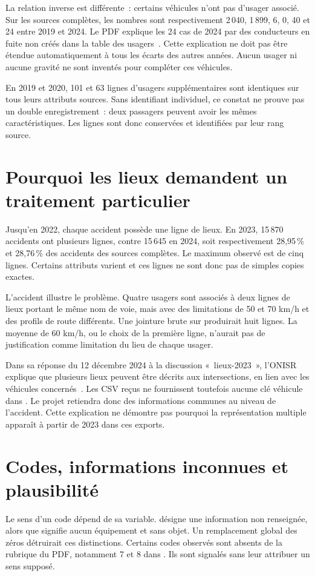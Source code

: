 La relation inverse est différente~: certains véhicules n'ont pas d'usager associé.
Sur les sources complètes, les nombres sont respectivement 2\,040, 1\,899, 6, 0, 40 et
24 entre 2019 et 2024. Le PDF explique les 24 cas de 2024 par des conducteurs en fuite
non créés dans la table des usagers~\cite{doc-onisr}. Cette explication ne doit pas être
étendue automatiquement à tous les écarts des autres années. Aucun usager ni aucune
gravité ne sont inventés pour compléter ces véhicules.

En 2019 et 2020, 101 et 63 lignes d'usagers supplémentaires sont identiques sur tous
leurs attributs sources. Sans identifiant individuel, ce constat ne prouve pas un
double enregistrement~: deux passagers peuvent avoir les mêmes caractéristiques.
Les lignes sont donc conservées et identifiées par leur rang source.

\section{Pourquoi les lieux demandent un traitement particulier}
Jusqu'en 2022, chaque accident possède une ligne de lieux. En 2023, 15\,870 accidents
ont plusieurs lignes, contre 15\,645 en 2024, soit respectivement 28,95\,\% et 28,76\,\%
des accidents des sources complètes. Le maximum observé est de cinq lignes. Certains
attributs varient et ces lignes ne sont donc pas de simples copies exactes.

L'accident  illustre le problème. Quatre usagers sont associés à
deux lignes de lieux portant le même nom de voie, mais avec des limitations de 50 et
70 km/h et des profils de route différents. Une jointure brute sur 
produirait huit lignes. La moyenne de 60 km/h, ou le choix de la première ligne,
n'aurait pas de justification comme limitation du lieu de chaque usager.

Dans sa réponse du 12 décembre 2024 à la discussion «~lieux-2023~», l'ONISR explique
que plusieurs lieux peuvent être décrits aux intersections, en lien avec les véhicules
concernés~\cite{discussion-lieux}. Les CSV reçus ne fournissent toutefois aucune clé
véhicule dans . Le projet retiendra donc des informations communes au
niveau de l'accident. Cette explication ne démontre pas pourquoi la représentation
multiple apparaît à partir de 2023 dans ces exports.

\section{Codes, informations inconnues et plausibilité}
Le sens d'un code dépend de sa variable.  désigne une information
non renseignée, alors que  signifie aucun équipement et
 sans objet. Un remplacement global des zéros détruirait ces distinctions.
Certains codes observés sont absents de la rubrique du PDF, notamment 7 et 8 dans
. Ils sont signalés sans leur attribuer un sens supposé.

